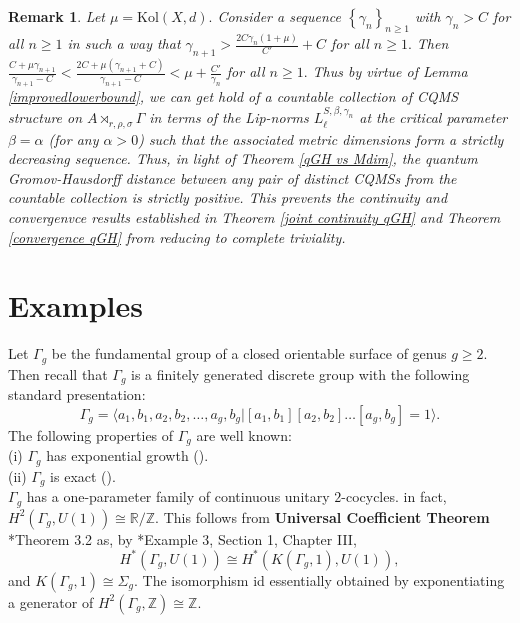 \documentclass[a4paper,11pt,reqno]{amsart}
\theoremstyle{plain}
\newtheorem{rem}[thm]{Remark}
\theoremstyle{mainthmstyle}
\theoremstyle{named}
\numberwithin{equation}{section}
\begin{document}
\begin{rem}\label{qGHcollapse}
Let $\mu = \mathrm {Kol} (X, d).$ Consider a sequence $\left \{\gamma_n \right \}_{n \geq 1}$ with $\gamma_n > C$ for all $n \geq 1$ in such a way that $\gamma_{n + 1} > \frac {2 C \gamma_n (1 + \mu)} {C'} + C$ for all $n \geq 1.$ Then $\frac {C + \mu \gamma_{n + 1}} {\gamma_{n + 1} - C } < \frac {2 C + \mu \left (\gamma_{n + 1} + C \right )} {\gamma_{n + 1} - C} < \mu + \frac {C'} {\gamma_n}$ for all $n \geq 1.$ Thus by virtue of Lemma \ref{improvedlowerbound}, we can get hold of a countable collection of CQMS structure on $A \rtimes_{r, \rho, \sigma} \Gamma$ in terms of the Lip-norms $L_{\ell}^{S, \beta, \gamma_n}$ at the critical parameter $\beta = \alpha$ (for any $\alpha > 0$) such that the associated metric dimensions form a strictly decreasing sequence. Thus, in light of Theorem \ref{qGH vs Mdim}, the quantum Gromov-Hausdorff distance between any pair of distinct CQMSs from the countable collection is strictly positive. This prevents the continuity and convergenvce results established in Theorem \ref{joint continuity qGH} and Theorem \ref{convergence qGH} from reducing to complete triviality. 
\end{rem}

\section{Examples} \label{Examples}
Let $\Gamma_{g}$ be the fundamental group of a closed orientable surface of genus $g\geq 2$. Then recall that $\Gamma_g$ is a finitely generated discrete group with the following standard presentation:
\begin{displaymath}
    \Gamma_g=\langle a_{1},b_{1},a_2,b_2,\ldots,a_g,b_g|[a_{1},b_1][a_2,b_2]\ldots[a_g,b_g]=1\rangle.
\end{displaymath}
The following properties of $\Gamma_g$ are well known:\\
(i) $\Gamma_g$ has exponential growth (\cite{Sambu-tight}).\\
(ii) $\Gamma_g$ is exact (\cite{Anan-Del-Exact}).\\
$\Gamma_g$ has a one-parameter family of continuous unitary $2$-cocycles. in fact, $H^2(\Gamma_g,U(1))\cong\mathbb{R}/\mathbb{Z}.$ This follows from \textbf{Universal Coefficient Theorem} \cite{Hatcher-Alg-Top}*{Theorem 3.2} as, by \cite{Brown-Cohom}*{Example 3, Section 1, Chapter III}, $$H^{\ast} \left (\Gamma_g, U (1) \right ) \cong H^{\ast} \left (K \left (\Gamma_g, 1 \right ), U (1) \right ),$$ and $K \left (\Gamma_g, 1 \right ) \cong \Sigma_g.$ The isomorphism id essentially obtained by exponentiating a generator of $H^{2}(\Gamma_g,\mathbb{Z})\cong\mathbb{Z}.$
\end{document}
